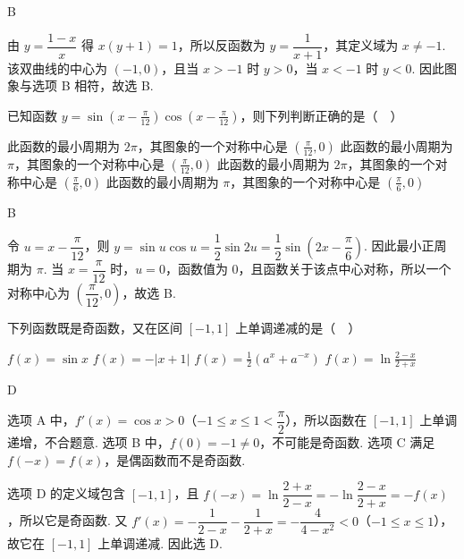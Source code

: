 \begin{answer}
B
\end{answer}

\begin{solution}
由 \(y=\dfrac{1-x}{x}\) 得 \(x(y+1)=1\)，所以反函数为 \(y=\dfrac{1}{x+1}\)，其定义域为 \(x\neq -1\). 该双曲线的中心为 \((-1,0)\)，且当 \(x>-1\) 时 \(y>0\)，当 \(x<-1\) 时 \(y<0\). 因此图象与选项 B 相符，故选 B.
\end{solution}

\begin{problem}
已知函数 \( y = \sin \left( x - \frac{\pi}{12} \right) \cos \left( x - \frac{\pi}{12} \right) \)，则下列判断正确的是（\(\quad\)）

\choices
    {此函数的最小周期为 \(2\pi\)，其图象的一个对称中心是 \(\left(\frac{\pi}{12}, 0\right)\)}
    {此函数的最小周期为 \(\pi\)，其图象的一个对称中心是 \(\left(\frac{\pi}{12}, 0\right)\)}
    {此函数的最小周期为 \(2\pi\)，其图象的一个对称中心是 \(\left(\frac{\pi}{6}, 0\right)\)}
    {此函数的最小周期为 \(\pi\)，其图象的一个对称中心是 \(\left(\frac{\pi}{6}, 0\right)\)}
\end{problem}

\begin{answer}
B
\end{answer}

\begin{solution}
令 \(u=x-\dfrac{\pi}{12}\)，则 \(y=\sin u\cos u=\dfrac12\sin 2u=\dfrac12\sin\left(2x-\dfrac{\pi}{6}\right)\). 因此最小正周期为 \(\pi\). 当 \(x=\dfrac{\pi}{12}\) 时，\(u=0\)，函数值为 \(0\)，且函数关于该点中心对称，所以一个对称中心为 \(\left(\dfrac{\pi}{12},0\right)\)，故选 B.
\end{solution}

\begin{problem}
下列函数既是奇函数，又在区间 \([-1, 1]\) 上单调递减的是（\(\quad\)）

\choices
    {\(f(x) = \sin x\)}
    {\(f(x) = -|x + 1|\)}
    {\(f(x) = \frac{1}{2} (a^x + a^{-x})\)}
    {\(f(x) = \ln \frac{2 - x}{2 + x}\)}
\end{problem}

\begin{answer}
D
\end{answer}

\begin{solution}
选项 A 中，\(f'(x)=\cos x>0\)（\(-1\leqslant x\leqslant1<\dfrac\pi2\)），所以函数在 \([-1,1]\) 上单调递增，不合题意. 选项 B 中，\(f(0)=-1\neq0\)，不可能是奇函数. 选项 C 满足 \(f(-x)=f(x)\)，是偶函数而不是奇函数.

选项 D 的定义域包含 \([-1,1]\)，且
\(f(-x)=\ln\dfrac{2+x}{2-x}=-\ln\dfrac{2-x}{2+x}=-f(x)\)，所以它是奇函数. 又
\(f'(x)=-\dfrac{1}{2-x}-\dfrac{1}{2+x}=-\dfrac{4}{4-x^2}<0\)（\(-1\leqslant x\leqslant1\)），故它在 \([-1,1]\) 上单调递减. 因此选 D.
\end{solution}

